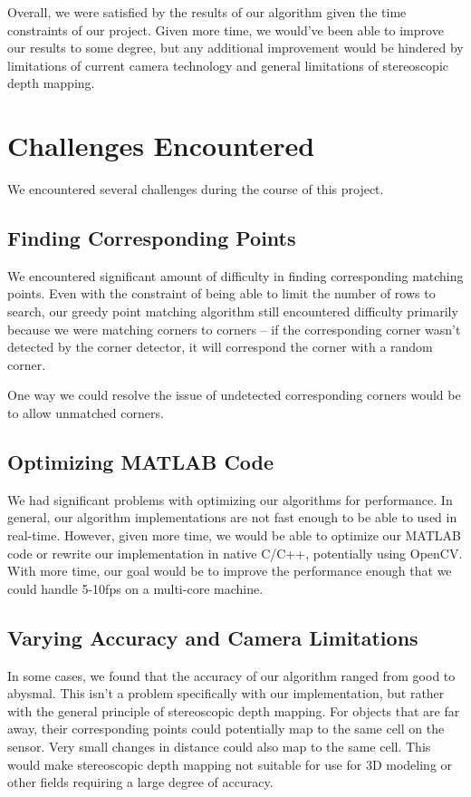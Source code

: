 Overall, we were satisfied by the results of our algorithm given the time constraints of our project. Given more time, we would've been able to improve our results to some degree, but any additional improvement would be hindered by limitations of current camera technology and general limitations of stereoscopic depth mapping. 

\section{Challenges Encountered}
\label{conclusion:challenges}
We encountered several challenges during the course of this project. 
\subsection{Finding Corresponding Points}
We encountered significant amount of difficulty in finding corresponding matching points. Even with the constraint of being able to limit the number of rows to search, our greedy point matching algorithm still encountered difficulty primarily because we were matching corners to corners -- if the corresponding corner wasn't detected by the corner detector, it will correspond the corner with a random corner. 

One way we could resolve the issue of undetected corresponding corners would be to allow unmatched corners. 

\subsection{Optimizing MATLAB Code}
We had significant problems with optimizing our algorithms for performance. In general, our algorithm implementations are not fast enough to be able to used in real-time. However, given more time, we would be able to optimize our MATLAB code or rewrite our implementation in native C/C++, potentially using OpenCV. With more time, our goal would be to improve the performance enough that we could handle 5-10fps on a multi-core machine. 

\subsection{Varying Accuracy and Camera Limitations}
In some cases, we found that the accuracy of our algorithm ranged from good to abysmal. This isn't a problem specifically with our implementation, but rather with the general principle of stereoscopic depth mapping. For objects that are far away, their corresponding points could potentially map to the same cell on the sensor. Very small changes in distance could also map to the same cell. This would make stereoscopic depth mapping not suitable for use for 3D modeling or other fields requiring a large degree of accuracy. 

